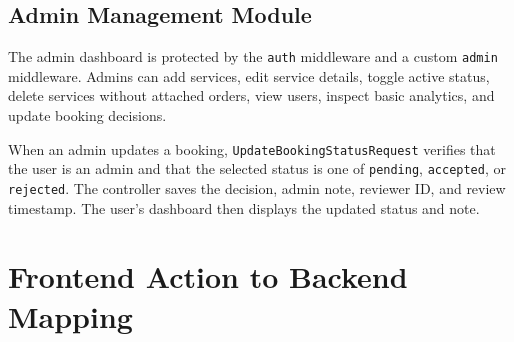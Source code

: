 \documentclass[12pt,a4paper]{report}
\begin{document}
\section{Admin Management Module}

The admin dashboard is protected by the \texttt{auth} middleware and a custom \texttt{admin} middleware. Admins can add services, edit service details, toggle active status, delete services without attached orders, view users, inspect basic analytics, and update booking decisions.

When an admin updates a booking, \texttt{UpdateBookingStatusRequest} verifies that the user is an admin and that the selected status is one of \texttt{pending}, \texttt{accepted}, or \texttt{rejected}. The controller saves the decision, admin note, reviewer ID, and review timestamp. The user's dashboard then displays the updated status and note.

\chapter{Frontend Action to Backend Mapping}
\end{document}
